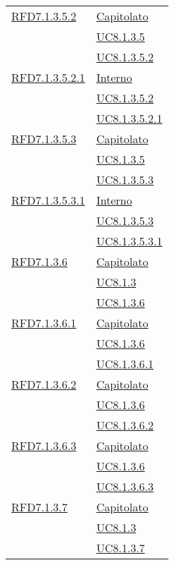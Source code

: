 \begin{longtable}{|>{\centering}m{5cm}|m{5cm}<{\centering}|}
\hyperlink{RFD7.1.3.5.2}{RFD7.1.3.5.2} & \hyperlink{Capitolato}{Capitolato}\\
& \hyperref[UC8.1.3.5]{UC8.1.3.5}\\
& \hyperref[UC8.1.3.5.2]{UC8.1.3.5.2}\\ \hline

\hyperlink{RFD7.1.3.5.2.1}{RFD7.1.3.5.2.1} & \hyperlink{Interno}{Interno}\\
& \hyperref[UC8.1.3.5.2]{UC8.1.3.5.2}\\
& \hyperref[UC8.1.3.5.2.1]{UC8.1.3.5.2.1}\\ \hline

\hyperlink{RFD7.1.3.5.3}{RFD7.1.3.5.3} & \hyperlink{Capitolato}{Capitolato}\\
& \hyperref[UC8.1.3.5]{UC8.1.3.5}\\
& \hyperref[UC8.1.3.5.3]{UC8.1.3.5.3}\\ \hline

\hyperlink{RFD7.1.3.5.3.1}{RFD7.1.3.5.3.1} & \hyperlink{Interno}{Interno}\\
& \hyperref[UC8.1.3.5.3]{UC8.1.3.5.3}\\
& \hyperref[UC8.1.3.5.3.1]{UC8.1.3.5.3.1}\\ \hline

\hyperlink{RFD7.1.3.6}{RFD7.1.3.6} & \hyperlink{Capitolato}{Capitolato}\\
& \hyperref[UC8.1.3]{UC8.1.3}\\
& \hyperref[UC8.1.3.6]{UC8.1.3.6}\\ \hline

\hyperlink{RFD7.1.3.6.1}{RFD7.1.3.6.1} & \hyperlink{Capitolato}{Capitolato}\\
& \hyperref[UC8.1.3.6]{UC8.1.3.6}\\
& \hyperref[UC8.1.3.6.1]{UC8.1.3.6.1}\\ \hline

\hyperlink{RFD7.1.3.6.2}{RFD7.1.3.6.2} & \hyperlink{Capitolato}{Capitolato}\\
& \hyperref[UC8.1.3.6]{UC8.1.3.6}\\
& \hyperref[UC8.1.3.6.2]{UC8.1.3.6.2}\\ \hline

\hyperlink{RFD7.1.3.6.3}{RFD7.1.3.6.3} & \hyperlink{Capitolato}{Capitolato}\\
& \hyperref[UC8.1.3.6]{UC8.1.3.6}\\
& \hyperref[UC8.1.3.6.3]{UC8.1.3.6.3}\\ \hline

\hyperlink{RFD7.1.3.7}{RFD7.1.3.7} & \hyperlink{Capitolato}{Capitolato}\\
& \hyperref[UC8.1.3]{UC8.1.3}\\
& \hyperref[UC8.1.3.7]{UC8.1.3.7}\\ \hline


\end{longtable}

